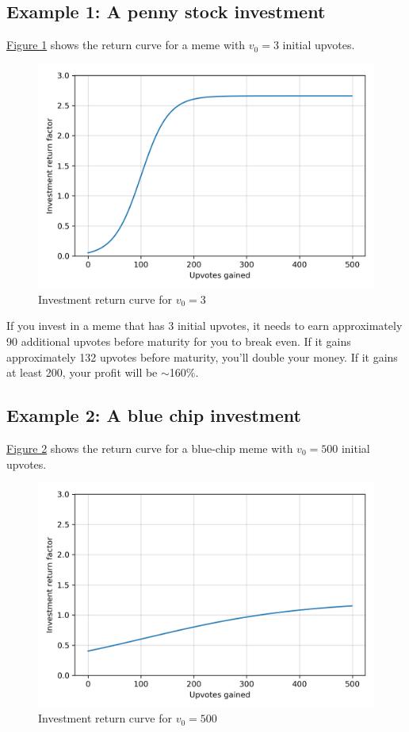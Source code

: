 \documentclass[a4paper, 12pt]{article}
\begin{document}
\subsection*{Example 1: A penny stock investment}
\label{sec:org4933259}

\hyperref[fig:org3ad97b1]{Figure 1} shows the return curve for a meme with \(v_0 = 3\) initial upvotes.

\begin{figure}[H]
\centering
\includegraphics[width=.9\linewidth]{./paper_figure_1.png}
\caption{\label{fig:org3ad97b1}
Investment return curve for \(v_0 = 3\)}
\end{figure}

If you invest in a meme that has 3 initial upvotes, it needs to earn approximately 90
additional upvotes before maturity for you to break even. If it gains
approximately 132 upvotes before maturity, you'll double your money. If it gains
at least 200, your profit will be \(\sim\)160\%.

\subsection*{Example 2: A blue chip investment}
\label{sec:orgb52344e}

\hyperref[fig:orgdcdfa57]{Figure 2} shows the return curve for a blue-chip meme with \(v_0 = 500\)
initial upvotes.

\begin{figure}[H]
\centering
\includegraphics[width=.9\linewidth]{./paper_figure_2.png}
\caption{\label{fig:orgdcdfa57}
Investment return curve for \(v_0 = 500\)}
\end{figure}
\end{document}
